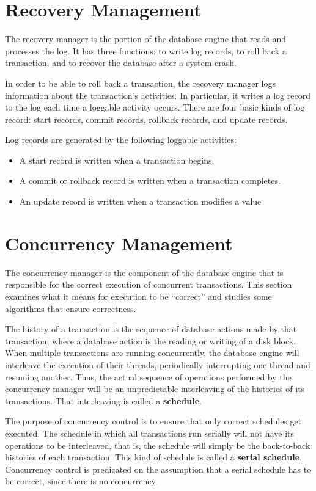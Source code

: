 \documentclass{article}
\begin{document}
\section*{Recovery Management}
The recovery manager is the portion of the database engine that reads and processes the log. It has three functions: to write log records, to roll back a transaction, and to recover the database after a system crash.

In order to be able to roll back a transaction, the recovery manager logs information about the transaction’s activities. In particular, it writes a log record to the log each time a loggable activity occurs. There are four basic kinds of log record: start records, commit records, rollback records, and update records.

Log records are generated by the following loggable activities:
\begin{itemize}


\item A start record is written when a transaction begins.
\item A commit or rollback record is written when a transaction completes.
\item An update record is written when a transaction modifies a value

\end{itemize}

\section*{Concurrency Management}
The concurrency manager is the component of the database engine that is responsible for the correct execution of concurrent transactions. This section examines what it means for execution to be “correct” and studies some algorithms that ensure correctness.

The history of a transaction is the sequence of database actions made by
that transaction, where a database action is the reading or writing of a disk block. When multiple transactions are running concurrently, the database engine will interleave the execution of their threads, periodically interrupting one thread and resuming another. Thus, the actual sequence of operations performed by the concurrency manager will be an unpredictable interleaving of the histories of its transactions. That interleaving is called a \textbf{schedule}.


The purpose of concurrency control is to ensure that only correct schedules get executed. The schedule in which all transactions run serially will not have its operations to be interleaved, that is, the schedule will simply be the back-to-back histories of each transaction. This kind of schedule is called a \textbf{serial schedule}. Concurrency control is predicated on the assumption that a serial schedule has to be correct, since there is no concurrency.
\end{document}
